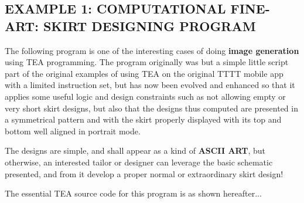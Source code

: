 \documentclass[a4paper, 18pt]{book} %
\begin{document}
\subsection{EXAMPLE 1: \textbf{COMPUTATIONAL FINE-ART:} SKIRT DESIGNING PROGRAM}
\label{SECEXAMP1K}


The following program is one of the interesting cases of doing \textbf{image generation} using TEA programming. The program originally was but a simple little script part of the original examples of using TEA on the original TTTT mobile app with a limited instruction set, but has now been evolved and enhanced so that it applies some useful logic and design constraints such as not allowing empty or very short skirt designs, but also that the designs thus computed are presented in a symmetrical pattern and with the skirt properly displayed with its top and bottom well aligned in portrait mode.

\vspace{2em}

The designs are simple, and shall appear as a kind of \textbf{ASCII ART}, but otherwise, an interested tailor or designer can leverage the basic schematic presented, and from it develop a proper normal or extraordinary skirt design!

\vspace{2em}

The essential TEA source code for this program is as shown hereafter...


\vspace{2em}
\end{document}
